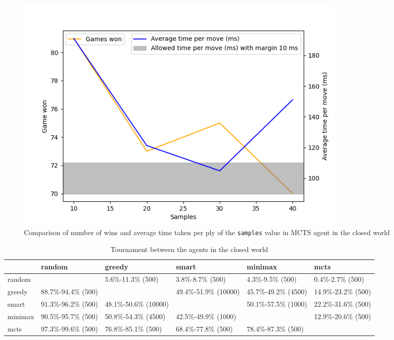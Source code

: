 \begin{figure}[h]
  \centering
  \captionsetup{justification=centering}
  \includegraphics[width=0.8\textwidth]{../img/mcts_samples_closedworld.png}
  \caption{Comparison of number of wins and average time taken per ply of the \texttt{samples} value in MCTS agent in the closed world}
  \label{mctsCWSamples}
\end{figure}

\begin{table}[!ht]
    \centering
    \captionsetup{justification=centering}
    \begin{tabularx}{\textwidth}{|X|X|X|X|X|X|}
    \hline
        ~ & random & greedy & smart & minimax & mcts \\ \hline
        random & ~ & \footnotesize{5.6\%-11.3\% (500)} & \footnotesize{3.8\%-8.7\% (500)} & \footnotesize{4.3\%-9.5\% (500)} & \footnotesize{0.4\%-2.7\% (500)} \\ \hline
        greedy & \footnotesize{88.7\%-94.4\% (500)} & ~ & \footnotesize{49.4\%-51.9\% (10000)} & \footnotesize{45.7\%-49.2\% (4500)} & \footnotesize{14.9\%-23.2\% (500)} \\ \hline
        smart & \footnotesize{91.3\%-96.2\% (500)} & \footnotesize{48.1\%-50.6\% (10000)} & ~ & \footnotesize{50.1\%-57.5\% (1000)} & \footnotesize{22.2\%-31.6\% (500)} \\ \hline
        minimax & \footnotesize{90.5\%-95.7\% (500)} & \footnotesize{50.8\%-54.3\% (4500)} & \footnotesize{42.5\%-49.9\% (1000)} & ~ & \footnotesize{12.9\%-20.6\% (500)} \\ \hline
        mcts & \footnotesize{97.3\%-99.6\% (500)} & \footnotesize{76.8\%-85.1\% (500)} & \footnotesize{68.4\%-77.8\% (500)} & \footnotesize{78.4\%-87.3\% (500)} & \\ \bottomrule
    \end{tabularx}
    \caption{Tournament between the agents in the closed world}
    \label{tournamentClosedWorld}
\end{table}

